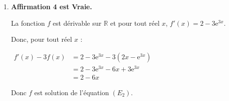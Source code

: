 \documentclass[10pt]{article}
\providecommand{\R}{\mathbb{R}}
\providecommand{\e}{{\mathrm{e}}}
\begin{document}
\begin{enumerate}
\begin{enumerate}
	Or $\lim\limits_{x\to +\infty} \dfrac{1}{x} =0 $ donc, par somme,  $\lim\limits_{x\to +\infty }1 -\dfrac{1}{x} =1 $ et  $\lim\limits_{x\to +\infty }1 +\dfrac{1}{x} =1 $. 
	
	D'après le théorème des gendarmes, on a donc : $\lim\limits_{x\to +\infty }f(x) =1 $. 
	
	C'est à dire, la droite d'équation $y=1$ est une asymptote horizontale à la courbe représentative de la fonction $f$ au voisinage de $+\infty$.
	\end{enumerate}



	\item 	\textbf{Affirmation 4  est Vraie.} 
	
	
	 La fonction $f$ est dérivable sur $\R$ et pour tout réel $x$, $f'(x) = 2 -3 \e^{3x}$.
	
	Donc, pour tout réel $x$ : 
	
	$\begin{aligned} f'(x) -3f(x) &=  2 -3 \e^{3x} - 3 \left(2x-\e^{3x}\right) \\
		 &= 2 -3 \e^{3x} - 6x +3 \e^{3x} \\
		 &= 2  - 6x 
		 \end{aligned}$ 
		 
		 Donc $f$ est solution de l'équation $(E_{2})$.
	
\end{enumerate}
\end{document}
